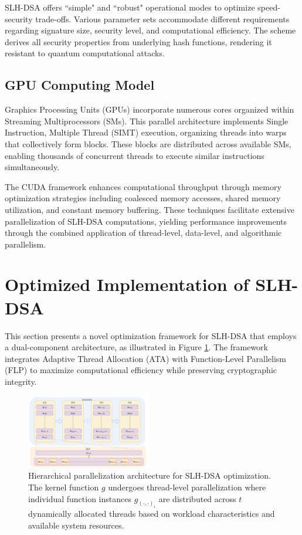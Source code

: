 \documentclass[journal]{IEEEtran}
\begin{document}
SLH-DSA offers ``simple" and ``robust" operational modes to optimize speed-security trade-offs. Various parameter sets accommodate different requirements regarding signature size, security level, and computational efficiency. The scheme derives all security properties from underlying hash functions, rendering it resistant to quantum computational attacks.

\subsection{GPU Computing Model}

Graphics Processing Units (GPUs) incorporate numerous cores organized within Streaming Multiprocessors (SMs). This parallel architecture implements Single Instruction, Multiple Thread (SIMT) execution, organizing threads into warps that collectively form blocks. These blocks are distributed across available SMs, enabling thousands of concurrent threads to execute similar instructions simultaneously.

The CUDA framework enhances computational throughput through memory optimization strategies including coalesced memory accesses, shared memory utilization, and constant memory buffering. These techniques facilitate extensive parallelization of SLH-DSA computations, yielding performance improvements through the combined application of thread-level, data-level, and algorithmic parallelism.

\section{Optimized Implementation of SLH-DSA}\label{sec:implementation}

This section presents a novel optimization framework for SLH-DSA that employs a dual-component architecture, as illustrated in Figure \ref{fig:optimization_architecture}. The framework integrates Adaptive Thread Allocation (ATA) with Function-Level Parallelism (FLP) to maximize computational efficiency while preserving cryptographic integrity.

\begin{figure}[htbp]
  \centering
  \includegraphics[width=0.48\textwidth]{./fig/optimize-overview.drawio.pdf}
  \caption{Hierarchical parallelization architecture for SLH-DSA optimization. The kernel function $g$ undergoes thread-level parallelization where individual function instances $g_{(\cdot,\cdot)_i}$ are distributed across $t$ dynamically allocated threads based on workload characteristics and available system resources.}
  \label{fig:optimization_architecture}
\end{figure}
\end{document}
